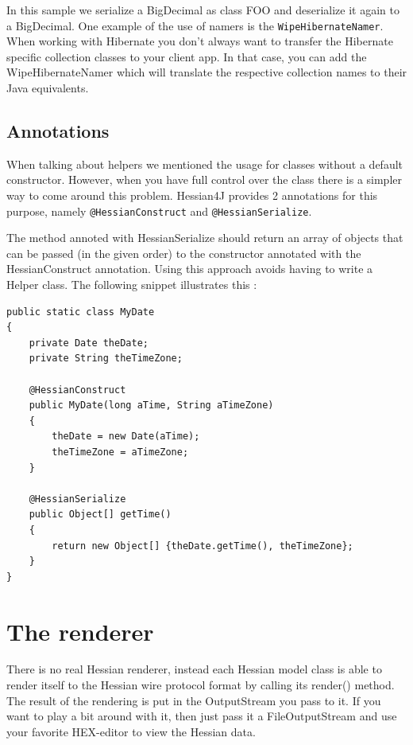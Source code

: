 \documentclass[a4paper]{article}
\begin{document}
In this sample we serialize a BigDecimal as class FOO and deserialize it again to a BigDecimal.  One example of the use of namers is the \lstinline$WipeHibernateNamer$. When working with Hibernate you don't always want to transfer the Hibernate specific collection classes to your client app. In that case, you can add the WipeHibernateNamer which will translate the respective collection names to their Java equivalents. 

\subsection{Annotations}

When talking about helpers we mentioned the usage for classes without a default constructor. However, when you have full control over the class there is a simpler way to come around this problem. Hessian4J provides 2 annotations for this purpose, namely \lstinline$@HessianConstruct$ and \lstinline$@HessianSerialize$.


The method annoted with HessianSerialize should return an array of objects that can be passed (in the given order) to the constructor annotated with the HessianConstruct annotation. Using this approach avoids having to write a Helper class. 
The following snippet illustrates this :

\medskip
\begin{lstlisting}
public static class MyDate
{
    private Date theDate;
    private String theTimeZone;

    @HessianConstruct
    public MyDate(long aTime, String aTimeZone)
    {
        theDate = new Date(aTime);
        theTimeZone = aTimeZone;
    }

    @HessianSerialize
    public Object[] getTime()
    {
        return new Object[] {theDate.getTime(), theTimeZone};
    }
}
\end{lstlisting}
\medskip
    
\section{The renderer}

There is no real Hessian renderer, instead each Hessian model class is able to render itself to the Hessian wire protocol format by calling its
render() method. The result of the rendering is put in the OutputStream you pass to it.
If you want to play a bit around with it, then just pass it a FileOutputStream and use your favorite HEX-editor to view the Hessian data.
\end{document}
